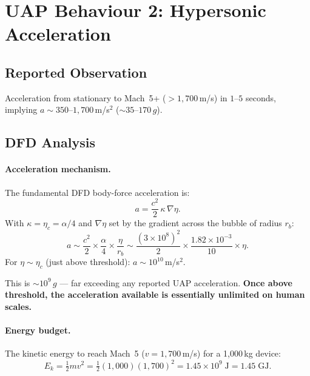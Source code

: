 \documentclass[12pt,a4paper]{article}
\begin{document}
\section{UAP Behaviour 2: Hypersonic Acceleration}\label{sec:hypersonic}

\subsection{Reported Observation}

Acceleration from stationary to Mach~5+ ($> 1{,}700$\,m/s) in $1$--$5$
seconds, implying $a \sim 350$--$1{,}700$\,m/s$^2$ ($\sim 35$--$170\,g$).

\subsection{DFD Analysis}

\paragraph{Acceleration mechanism.}
The fundamental DFD body-force acceleration is:
\begin{equation}
a = \frac{c^2}{2}\,\kappa\,\nabla\eta.
\end{equation}
With $\kappa = \eta_c = \alpha/4$ and $\nabla\eta$ set by the
gradient across the bubble of radius $r_b$:
\begin{equation}
a \sim \frac{c^2}{2} \times \frac{\alpha}{4} \times \frac{\eta}{r_b}
\sim \frac{(3\times 10^8)^2}{2} \times \frac{1.82\times 10^{-3}}{10}
\times \eta.
\end{equation}
For $\eta \sim \eta_c$ (just above threshold): $a \sim 10^{10}$\,m/s$^2$.

This is $\sim 10^9\,g$ --- far exceeding any reported UAP acceleration.
\textbf{Once above threshold, the acceleration available is essentially
unlimited on human scales.}

\paragraph{Energy budget.}
The kinetic energy to reach Mach~5 ($v = 1{,}700$\,m/s) for a 1{,}000\,kg device:
\begin{equation}
E_k = \tfrac{1}{2}mv^2 = \tfrac{1}{2}(1{,}000)(1{,}700)^2
= 1.45 \times 10^9\;\text{J} = 1.45\;\text{GJ}.
\end{equation}
\end{document}
